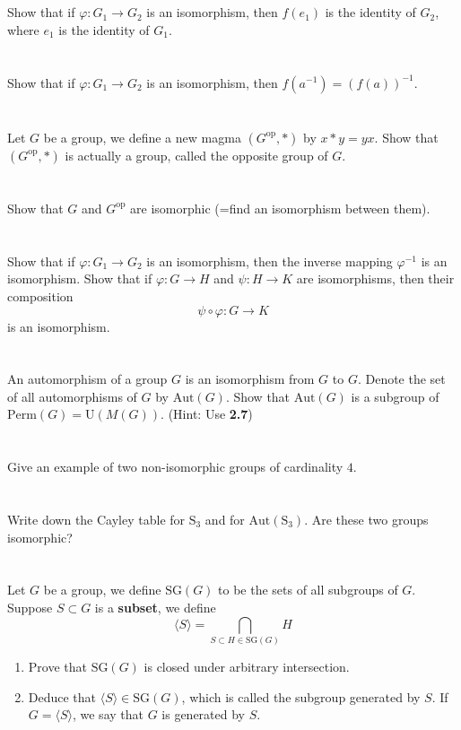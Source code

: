 \documentclass{report}
\begin{document}
\section{}
Show that if $\varphi: G_1 \rightarrow G_2$ is an isomorphism, then $f(e_1)$ is the identity of $G_2$, where $e_1$ is the identity of $G_1$.
\section{}
Show that if $\varphi: G_1 \rightarrow G_2$ is an isomorphism, then $f(a^{-1}) = (f(a))^{-1}$.
\section{}
Let $G$ be a group, we define a new magma $(G^\text{op},*)$ by $x*y = yx$. Show that $(G^\text{op},*)$ is actually a group, called the opposite group of $G$.
\section{}
Show that $G$ and $G^{\text{op}}$ are isomorphic (=find an isomorphism between them).
\section{}
Show that if $\varphi: G_1 \rightarrow G_2$ is an isomorphism, then the inverse mapping $\varphi^{-1}$ is an isomorphism. Show that if $\varphi: G \rightarrow H$ and $\psi: H \rightarrow K$ are isomorphisms, then their composition
\[\psi \circ \varphi: G \rightarrow K\]
is an isomorphism.
\section{}
An automorphism of a group $G$ is an isomorphism from $G$ to $G$. Denote the set of all automorphisms of $G$ by $\text{Aut}(G)$. Show that $\text{Aut}(G)$ is a subgroup of $\text{Perm}(G) = \text{U}(M(G))$. (Hint: Use \textbf{2.7})
\section{}
Give an example of two non-isomorphic groups of cardinality $4$.
\section{}
Write down the Cayley table for $\text{S}_3$ and for $\text{Aut}(\text{S}_3)$. Are these two groups isomorphic?
\section{}
Let $G$ be a group, we define $\text{SG}(G)$ to be the sets of all subgroups of $G$. Suppose $S\subset G$ is a \textbf{subset}, we define
\[\langle S\rangle = \bigcap_{S \subset H \in \text{SG}(G)} H\]
\begin{enumerate}
\item Prove that $\text{SG}(G)$ is closed under arbitrary intersection.
\item Deduce that $\langle S\rangle \in \text{SG}(G)$, which is called the subgroup generated by $S$. If $G = \langle S \rangle$, we say that $G$ is generated by $S$.
\end{enumerate}
\end{document}
